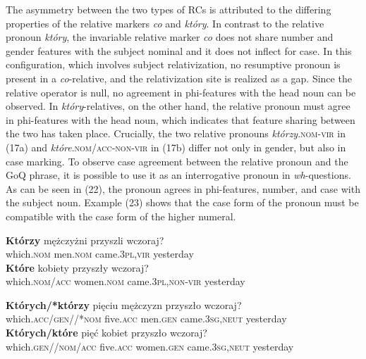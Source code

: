 \documentclass[output=paper]{langsci/langscibook}
\begin{document}
The asymmetry between the two types of RCs is attributed to the differing properties of the relative markers \textit{co} and \textit{który}. In contrast to the relative pronoun \textit{który}, the invariable relative marker \textit{co} does not share number and gender features with the subject nominal and it does not inflect for case. In this configuration, which involves subject relativization, no resumptive pronoun is present in a \textit{co}{}-relative, and the relativization site is realized as a gap. Since the relative operator is null, no agreement in phi-features with the head noun can be observed. In \textit{który}{}-relatives, on the other hand, the relative pronoun must agree in phi-features with the head noun, which indicates that feature sharing between the two has taken place. Crucially, the two relative pronouns \textit{którzy}.\textsc{nom-vir} in (17a) and \textit{które}.\textsc{nom\slash acc-non-vir} in (17b) differ not only in gender, but also in case marking. To observe case agreement between the relative pronoun and the GoQ phrase, it is possible to use it as an interrogative pronoun in \textit{wh}{}-questions. As can be seen in (22), the pronoun agrees in phi-features, number, and case with the subject noun. Example (23) shows that the case form of the pronoun must be compatible with the case form of the higher numeral.

\ea%
    \label{ex:leska:22}
    \ea
    \gll \textbf{Którzy}   mężczyżni   przyszli   wczoraj?\\
        which.\textsc{nom}   men.\textsc{nom}  came.\textsc{3pl,vir} yesterday\\
    \ex
    \gll \textbf{Które}   kobiety   przyszły     wczoraj?\\
         which.\textsc{nom/acc} women.\textsc{nom}   came.\textsc{3pl,non-vir} yesterday\\
    \z
\z    


\ea%
    \label{ex:leska:23}
    \ea
    \gll \textbf{Których/*którzy}   pięciu   mężczyzn   przyszło    wczoraj?\\
         which.\textsc{acc/gen//*nom} five.\textsc{acc} men.\textsc{gen}  came.\textsc{3sg,neut} yesterday\\
    \ex
    \gll \textbf{Których/które}  pięć     kobiet   przyszło     wczoraj?\\
         which.\textsc{gen//nom/acc} five.\textsc{acc} women.\textsc{gen}   came.\textsc{3sg,neut} yesterday\\
    \z
\z
\end{document}
